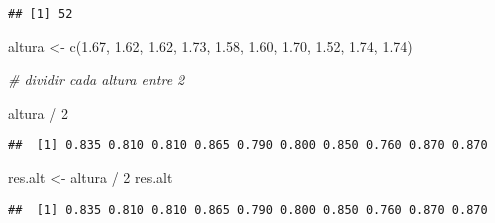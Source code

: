 \documentclass[
]{article}
\newenvironment{Shaded}{\begin{snugshade}}{\end{snugshade}}
\newcommand{\CommentTok}[1]{\textcolor[rgb]{0.56,0.35,0.01}{\textit{#1}}}
\newcommand{\DecValTok}[1]{\textcolor[rgb]{0.00,0.00,0.81}{#1}}
\newcommand{\FloatTok}[1]{\textcolor[rgb]{0.00,0.00,0.81}{#1}}
\newcommand{\FunctionTok}[1]{\textcolor[rgb]{0.00,0.00,0.00}{#1}}
\newcommand{\NormalTok}[1]{#1}
\newcommand{\OtherTok}[1]{\textcolor[rgb]{0.56,0.35,0.01}{#1}}
\newcommand{\SpecialCharTok}[1]{\textcolor[rgb]{0.00,0.00,0.00}{#1}}
\begin{document}
\begin{verbatim}
## [1] 52
\end{verbatim}

\begin{Shaded}
\begin{Highlighting}[]
\NormalTok{altura }\OtherTok{\textless{}{-}} \FunctionTok{c}\NormalTok{(}\FloatTok{1.67}\NormalTok{, }\FloatTok{1.62}\NormalTok{, }\FloatTok{1.62}\NormalTok{, }\FloatTok{1.73}\NormalTok{, }\FloatTok{1.58}\NormalTok{, }\FloatTok{1.60}\NormalTok{, }\FloatTok{1.70}\NormalTok{, }\FloatTok{1.52}\NormalTok{, }\FloatTok{1.74}\NormalTok{, }\FloatTok{1.74}\NormalTok{) }

\CommentTok{\# dividir cada altura entre 2}

\NormalTok{altura }\SpecialCharTok{/} \DecValTok{2}
\end{Highlighting}
\end{Shaded}

\begin{verbatim}
##  [1] 0.835 0.810 0.810 0.865 0.790 0.800 0.850 0.760 0.870 0.870
\end{verbatim}

\begin{Shaded}
\begin{Highlighting}[]
\NormalTok{res.alt }\OtherTok{\textless{}{-}}\NormalTok{ altura }\SpecialCharTok{/} \DecValTok{2}
\NormalTok{res.alt}
\end{Highlighting}
\end{Shaded}

\begin{verbatim}
##  [1] 0.835 0.810 0.810 0.865 0.790 0.800 0.850 0.760 0.870 0.870
\end{verbatim}
\end{document}
